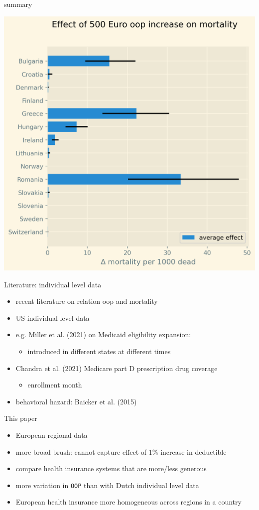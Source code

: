 \documentclass[presentation]{beamer}
\begin{document}
\begin{frame}[label={sec:org58d3245}]{summary}
\begin{center}
\includegraphics[width=0.6\linewidth]{./figures/change_mortality_countries_baseline.png}
\label{fig:SummaryFigure}
\end{center}
\end{frame}



\begin{frame}[label={sec:org56a2b53}]{Literature: individual level data}
\begin{itemize}
\item recent literature on relation oop and mortality
\item US individual level data
\item e.g. Miller et al. (2021) on Medicaid eligibility expansion:
\begin{itemize}
\item introduced in different states at different times
\end{itemize}
\item Chandra et al. (2021) Medicare part D prescription drug coverage
\begin{itemize}
\item enrollment month
\end{itemize}
\item behavioral hazard: Baicker et al. (2015)
\end{itemize}
\end{frame}

\begin{frame}[label={sec:orgef8585b},fragile]{This paper}
 \begin{itemize}
\item European regional data
\item more broad brush: cannot capture effect of 1\% increase in deductible
\item compare health insurance systems that are more/less generous
\item more variation in \texttt{OOP} than with Dutch individual level data
\item European health insurance more homogeneous across regions in a country
\end{itemize}
\end{frame}
\end{document}
